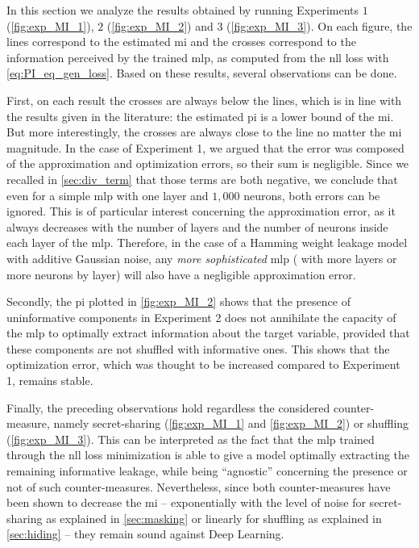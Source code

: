 In this section we analyze the results obtained by running Experiments \(1\) (\autoref{fig:exp_MI_1}), \(2\) (\autoref{fig:exp_MI_2}) and \(3\) (\autoref{fig:exp_MI_3}).
On each figure, the lines correspond to the estimated \gls{mi} and the crosses correspond to the information perceived by the trained \gls{mlp}, as computed from the \gls{nll} loss with \autoref{eq:PI_eq_gen_loss}.
Based on these results, several observations can be done.

First, on each result the crosses are always below the lines, which is in line with the results given in the literature: the estimated \gls{pi} is a lower bound of the \gls{mi}. 
But more interestingly, the crosses are always close to the line no matter the \gls{mi} magnitude.
In the case of Experiment 1, we argued that the error was composed of the approximation and optimization errors, so their sum is negligible.
Since we recalled in \autoref{sec:div_term} that those terms are both negative, we conclude that even for a simple \gls{mlp} with one layer and \(1,000\) neurons, both errors can be ignored. 
This is of particular interest concerning the approximation error, as it always decreases with the number of layers and the number of neurons inside each layer of the \gls{mlp}. 
Therefore, in the case of a Hamming weight leakage model with additive Gaussian noise, any \textit{more sophisticated} \gls{mlp} (\ie{} with more layers or more neurons by layer) will also have a negligible approximation error.

Secondly, the \gls{pi} plotted in \autoref{fig:exp_MI_2} shows that the presence of uninformative components in Experiment 2 does not annihilate the capacity of the \gls{mlp} to optimally extract information about the target variable, provided that these components are not shuffled with informative ones.
This shows that the optimization error, which was thought to be increased compared to Experiment 1, remains stable.

Finally, the preceding observations hold regardless the considered counter-measure, namely secret-sharing (\autoref{fig:exp_MI_1} and \autoref{fig:exp_MI_2}) or shuffling (\autoref{fig:exp_MI_3}).
This can be interpreted as the fact that the \gls{mlp} trained through the \gls{nll} loss minimization is able to give a model optimally extracting the remaining informative leakage, while being ``agnostic'' concerning the presence or not of such counter-measures.
Nevertheless, since both counter-measures have been shown to decrease the \gls{mi} -- exponentially with the level of noise for secret-sharing as explained in \autoref{sec:masking} or linearly for shuffling as explained in \autoref{sec:hiding} -- they remain sound against Deep Learning.

